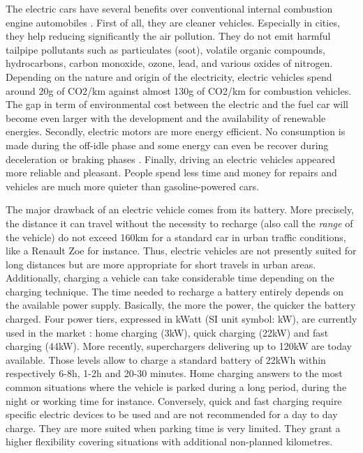 \begin{bibunit}[ieeetr]
\medskip
The electric cars have several benefits over conventional internal combustion engine automobiles \cite{VE_avantages}.
First of all, they are cleaner vehicles.
Especially in cities, they help reducing significantly the air pollution.
They do not emit harmful tailpipe pollutants such as particulates (soot), volatile organic compounds, hydrocarbons, carbon monoxide, ozone, lead, and various oxides of nitrogen.
Depending on the nature and origin of the electricity, electric vehicles spend around 20g of CO2/km against almost 130g of CO2/km for combustion vehicles.
The gap in term of environmental cost between the electric and the fuel car will become even larger with the development and the availability of renewable energies.
Secondly, electric motors are more energy efficient.
No consumption is made during the off-idle phase and some energy can even be recover during deceleration or braking phases \cite{artmeier_optimal_2010}.
Finally, driving an electric vehicles appeared more reliable and pleasant.
People spend less time and money for repairs and vehicles are much more quieter than gasoline-powered cars.

\medskip
The major drawback of an electric vehicle comes from its battery.
More precisely, the distance it can travel without the necessity to recharge (also call the \emph{range} of the vehicle) do not exceed 160km for a standard car in urban traffic conditions, like a Renault Zoe for instance.
Thus, electric vehicles are not presently suited for long distances but are more appropriate for short travels in urban areas.
Additionally, charging a vehicle can take considerable time depending on the charging technique.
The time needed to recharge a battery entirely depends on the available power supply.
Basically, the more the power, the quicker the battery charged.
Four power tiers, expressed in kWatt (SI unit symbol: kW), are currently used in the market \cite{livre_vert_2014}: home charging (3kW), quick charging (22kW) and fast charging (44kW).
More recently, superchargers delivering up to 120kW are today available.
Those levels allow to charge a standard battery of 22kWh within respectively 6-8h, 1-2h and 20-30 minutes.
Home charging answers to the most common situations where the vehicle is parked during a long period, during the night or working time for instance.
Conversely, quick and fast charging require specific electric devices to be used and are not recommended for a day to day charge.
They are more suited when parking time is very limited.
They grant a higher flexibility covering situations with additional non-planned kilometres.


\end{bibunit}
